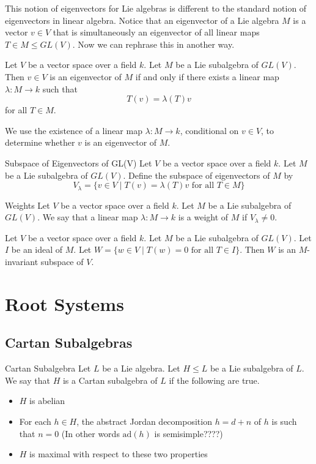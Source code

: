 \documentclass[a4paper]{article}
\begin{document}
This notion of eigenvectors for Lie algebras is different to the standard notion of eigenvectors in linear algebra. Notice that an eigenvector of a Lie algebra $M$ is a vector $v\in V$ that is simultaneously an eigenvector of all linear maps $T\in M\leq GL(V)$. Now we can rephrase this in another way. 

\begin{lmm}{}{} Let $V$ be a vector space over a field $k$. Let $M$ be a Lie subalgebra of $GL(V)$. Then $v\in V$ is an eigenvector of $M$ if and only if there exists a linear map $\lambda:M\to k$ such that $$T(v)=\lambda(T)v$$ for all $T\in M$. 
\end{lmm}

We use the existence of a linear map $\lambda:M\to k$, conditional on $v\in V$, to determine whether $v$ is an eigenvector of $M$. 

\begin{defn}{Subspace of Eigenvectors of GL(V)}{} Let $V$ be a vector space over a field $k$. Let $M$ be a Lie subalgebra of $GL(V)$. Define the subspace of eigenvectors of $M$ by $$V_\lambda=\{v\in V\;|\;T(v)=\lambda(T)v\text{ for all }T\in M\}$$
\end{defn}

\begin{defn}{Weights}{} Let $V$ be a vector space over a field $k$. Let $M$ be a Lie subalgebra of $GL(V)$. We say that a linear map $\lambda:M\to k$ is a weight of $M$ if $V_\lambda\neq 0$. 
\end{defn}

\begin{lmm}{}{} Let $V$ be a vector space over a field $k$. Let $M$ be a Lie subalgebra of $GL(V)$. Let $I$ be an ideal of $M$. Let $W=\{w\in V\;|\;T(w)=0\text{ for all }T\in I\}$. Then $W$ is an $M$-invariant subspace of $V$. 
\end{lmm}

\pagebreak
\section{Root Systems}
\subsection{Cartan Subalgebras}
\begin{defn}{Cartan Subalgebra}{} Let $L$ be a Lie algebra. Let $H\leq L$ be a Lie subalgebra of $L$. We say that $H$ is a Cartan subalgebra of $L$ if the following are true. 
\begin{itemize}
\item $H$ is abelian
\item For each $h\in H$, the abstract Jordan decomposition $h=d+n$ of $h$ is such that $n=0$ (In other words $\text{ad}(h)$ is semisimple????)
\item $H$ is maximal with respect to these two properties
\end{itemize}
\end{defn}
\end{document}

